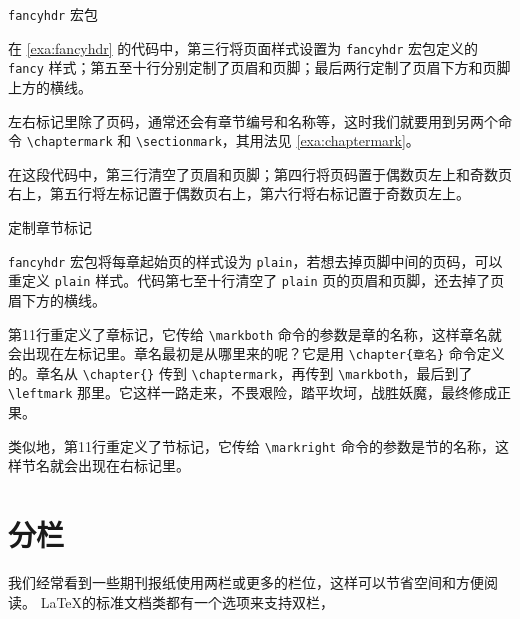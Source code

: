 \begin{example}[!h]
\caption{\texttt{fancyhdr} 宏包}
\label{exa:fancyhdr}
\end{example}

在 \autoref{exa:fancyhdr} 的代码中，第三行将页面样式设置为 \texttt{fancyhdr} 宏包定义的 \texttt{fancy} 样式；第五至十行分别定制了页眉和页脚；最后两行定制了页眉下方和页脚上方的横线。

左右标记里除了页码，通常还会有章节编号和名称等，这时我们就要用到另两个命令 \verb|\chaptermark| 和 \verb|\sectionmark|，其用法见 \autoref{exa:chaptermark}。

在这段代码中，第三行清空了页眉和页脚；第四行将页码置于偶数页左上和奇数页右上，第五行将左标记置于偶数页右上，第六行将右标记置于奇数页左上。

\begin{example}[h]
\caption{定制章节标记}
\label{exa:chaptermark}
\end{example}

\texttt{fancyhdr} 宏包将每章起始页的样式设为 \texttt{plain}，若想去掉页脚中间的页码，可以重定义 \texttt{plain} 样式。代码第七至十行清空了 \texttt{plain} 页的页眉和页脚，还去掉了页眉下方的横线。

第11行重定义了章标记，它传给 \verb|\markboth| 命令的参数是章的名称，这样章名就会出现在左标记里。章名最初是从哪里来的呢？它是用 \verb|\chapter{章名}| 命令定义的。章名从 \verb|\chapter{}| 传到 \verb|\chaptermark|，再传到 \verb|\markboth|，最后到了 \verb|\leftmark| 那里。它这样一路走来，不畏艰险，踏平坎坷，战胜妖魔，最终修成正果。

类似地，第11行重定义了节标记，它传给 \verb|\markright| 命令的参数是节的名称，这样节名就会出现在右标记里。

\section{分栏}

我们经常看到一些期刊报纸使用两栏或更多的栏位，这样可以节省空间和方便阅读。 \LaTeX 的标准文档类都有一个选项来支持双栏，


